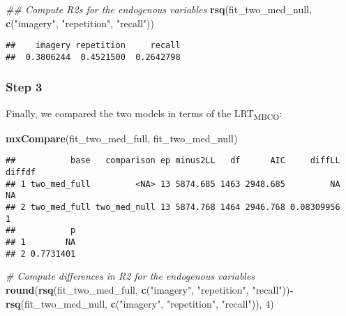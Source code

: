 \documentclass[11pt,]{article}
\newenvironment{Shaded}{\begin{snugshade}}{\end{snugshade}}
\newcommand{\CommentTok}[1]{\textcolor[rgb]{0.56,0.35,0.01}{\textit{#1}}}
\newcommand{\DecValTok}[1]{\textcolor[rgb]{0.00,0.00,0.81}{#1}}
\newcommand{\KeywordTok}[1]{\textcolor[rgb]{0.13,0.29,0.53}{\textbf{#1}}}
\newcommand{\NormalTok}[1]{#1}
\newcommand{\OperatorTok}[1]{\textcolor[rgb]{0.81,0.36,0.00}{\textbf{#1}}}
\newcommand{\StringTok}[1]{\textcolor[rgb]{0.31,0.60,0.02}{#1}}
\begin{document}
\begin{Shaded}
\begin{Highlighting}[]
\CommentTok{## Compute R2s for the endogenous variables}
\KeywordTok{rsq}\NormalTok{(fit_two_med_null, }\KeywordTok{c}\NormalTok{(}\StringTok{"imagery"}\NormalTok{, }\StringTok{"repetition"}\NormalTok{, }\StringTok{"recall"}\NormalTok{))}
\end{Highlighting}
\end{Shaded}

\begin{verbatim}
##    imagery repetition     recall 
##  0.3806244  0.4521500  0.2642798
\end{verbatim}

\hypertarget{step-3-1}{%
\subsubsection{Step 3}\label{step-3-1}}

Finally, we compared the two models in terms of the
LRT\textsubscript{MBCO}:

\begin{Shaded}
\begin{Highlighting}[]
\KeywordTok{mxCompare}\NormalTok{(fit_two_med_full, fit_two_med_null)}
\end{Highlighting}
\end{Shaded}

\begin{verbatim}
##           base   comparison ep minus2LL   df      AIC     diffLL diffdf
## 1 two_med_full         <NA> 13 5874.685 1463 2948.685         NA     NA
## 2 two_med_full two_med_null 13 5874.768 1464 2946.768 0.08309956      1
##           p
## 1        NA
## 2 0.7731401
\end{verbatim}

\begin{Shaded}
\begin{Highlighting}[]
\CommentTok{# Compute differences in R2 for the endogenous variables}
\KeywordTok{round}\NormalTok{(}\KeywordTok{rsq}\NormalTok{(fit_two_med_full, }\KeywordTok{c}\NormalTok{(}\StringTok{"imagery"}\NormalTok{, }\StringTok{"repetition"}\NormalTok{, }\StringTok{"recall"}\NormalTok{))}\OperatorTok{-}\StringTok{ }\KeywordTok{rsq}\NormalTok{(fit_two_med_null, }\KeywordTok{c}\NormalTok{(}\StringTok{"imagery"}\NormalTok{, }\StringTok{"repetition"}\NormalTok{, }\StringTok{"recall"}\NormalTok{)), }\DecValTok{4}\NormalTok{)}
\end{Highlighting}
\end{Shaded}
\end{document}

